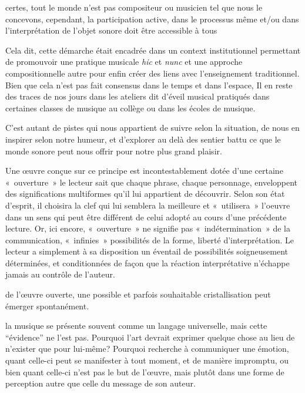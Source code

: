 certes, tout le monde n’est pas compositeur ou musicien tel que nous le concevons, cependant, la participation active, dans le processus même et/ou dans l’interprétation de l’objet sonore doit être accessible à tous 






Cela dit, cette démarche était encadrée dans un context institutionnel permettant de promouvoir une pratique musicale \textit{hic}  et \textit{nunc} et une approche compositionnelle autre pour enfin créer des liens avec l'enseignement traditionnel. Bien que cela n'est pas fait consensus dans le temps et dans l'espace, Il en reste des traces de nos jours dans les ateliers dit d'éveil musical pratiqués dans certaines classes de musique au collège ou dans les écoles de musique. 




C’est autant de pistes qui nous appartient de suivre selon la situation, de nous en inspirer selon notre humeur, et d’explorer au delà des sentier battu ce que le monde sonore peut nous offrir pour notre plus grand plaisir. 

Une œuvre conçue sur ce principe est incontestablement dotée d'une certaine « ouverture » le lecteur sait que chaque phrase, chaque personnage, enveloppent des significations multiformes qu'il lui appartient de découvrir. Selon son état d'esprit, il choisira la clef qui lui semblera la meilleure et « utilisera » l'oeuvre dans un sens qui peut être différent de celui adopté au cours d'une précédente lecture. Or, ici encore, « ouverture » ne signifie pas « indétermination » de la communication, « infinies » possibilités de la forme, liberté d'interprétation. Le lecteur a simplement à sa disposition un éventail de possibilités soigneusement déterminées, et conditionnées de façon que la réaction interprétative n'échappe jamais au contrôle de l'auteur.


de l’œuvre ouverte, une possible et parfois souhaitable cristallisation peut émerger spontanément.

la musique se présente souvent comme un langage universelle, mais cette “évidence” ne l’est pas. Pourquoi l’art devrait exprimer quelque chose au lieu de n’exister que pour lui-même? Pourquoi recherche à communiquer une émotion, quant celle-ci peut se manifester à tout moment, et de manière impromptu, ou bien quant celle-ci n’est pas le but de l’œuvre, mais plutôt dans une forme de perception autre que celle du message de son auteur. 



